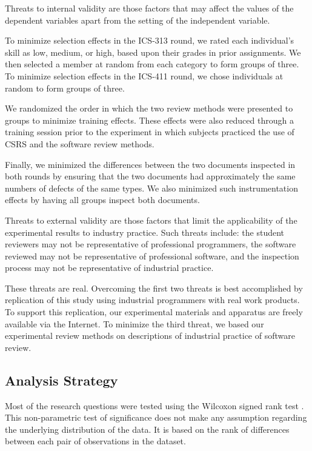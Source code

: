 Threats to internal validity are those factors that may affect the values
of the dependent variables apart from the setting of the independent
variable.

To minimize selection effects in the ICS-313 round, we rated each
individual's skill as low, medium, or high, based upon their grades in
prior assignments. We then selected a member at random from each category
to form groups of three. To minimize selection effects in the ICS-411
round, we chose individuals at random to form groups of three.

We randomized the order in which the two review methods were
presented to groups to minimize training effects. These effects  were
also reduced through a training session prior to the experiment in which
subjects practiced the use of CSRS and the software review methods.

Finally, we minimized the differences between the two documents inspected
in both rounds by ensuring that the two documents had approximately the
same numbers of defects of the same types. We also minimized
such instrumentation effects by having all groups inspect both documents.

Threats to external validity are those factors that limit the applicability
of the experimental results to industry practice. Such threats include: the
student reviewers may not be representative of professional programmers,
the software reviewed may not be representative of professional software,
and the inspection process may not be representative of industrial
practice.

These threats are real.  Overcoming the first two threats is best
accomplished by replication of this study using industrial programmers with
real work products. To support this replication, our experimental materials
and apparatus are freely available via the Internet.   To minimize the
third threat, we based our experimental review methods on descriptions of 
industrial practice of software review. 

\subsection{Analysis Strategy}

Most of the research questions were tested using the Wilcoxon signed rank
test \cite{Ferguson89}. This non-parametric test of significance does not
make any assumption regarding the underlying distribution of the data.  It
is based on the rank of differences between each pair of observations in
the dataset.

